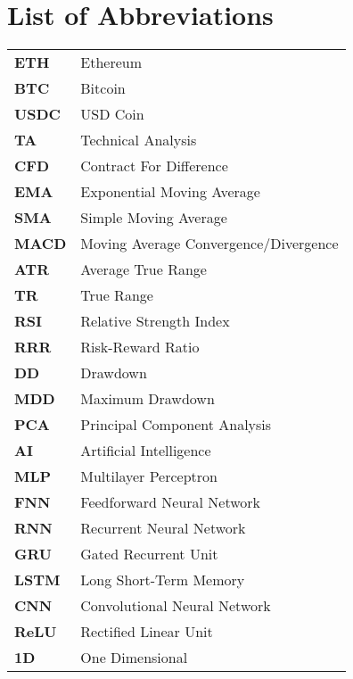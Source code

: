 \section*{List of Abbreviations}

\begin{tabularx}{\textwidth}{@{}lL{0.8\textwidth}@{}}
    \textbf{ETH}  & Ethereum                              \\
    \textbf{BTC}  & Bitcoin                               \\
    \textbf{USDC} & USD Coin                              \\


    \textbf{TA}   & Technical Analysis                    \\
    \textbf{CFD}  & Contract For Difference               \\
    \textbf{EMA}  & Exponential Moving Average            \\
    \textbf{SMA}  & Simple Moving Average                 \\
    \textbf{MACD} & Moving Average Convergence/Divergence \\
    \textbf{ATR}  & Average True Range                    \\
    \textbf{TR}   & True Range                            \\
    \textbf{RSI}  & Relative Strength Index               \\
    \textbf{RRR}  & Risk-Reward Ratio                     \\
    \textbf{DD}   & Drawdown                              \\
    \textbf{MDD}  & Maximum Drawdown                      \\

    \textbf{PCA}  & Principal Component Analysis          \\
    \textbf{AI}   & Artificial Intelligence               \\
    \textbf{MLP}  & Multilayer Perceptron                 \\
    \textbf{FNN}  & Feedforward Neural Network            \\
    \textbf{RNN}  & Recurrent Neural Network              \\
    \textbf{GRU}  & Gated Recurrent Unit                  \\
    \textbf{LSTM} & Long Short-Term Memory                \\
    \textbf{CNN}  & Convolutional Neural Network          \\
    \textbf{ReLU} & Rectified Linear Unit                 \\
    \textbf{1D}   & One Dimensional                       \\


\end{tabularx}

